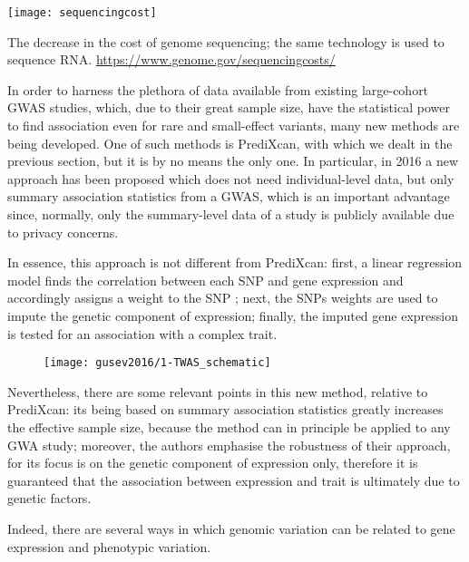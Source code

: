 \documentclass[../main.tex]{subfiles}
\begin{document}
\begin{marginfigure}[-4cm]
	\texttt{[image: sequencingcost]}
	\caption[Sequencing cost over time]{The decrease in the cost of 
	genome sequencing; the same technology is used to sequence RNA. 
	\url{https://www.genome.gov/sequencingcosts/}}
\end{marginfigure}

In order to harness the plethora of data available from existing 
large-cohort GWAS studies, which, due to their great sample size, have 
the statistical power to find association even for rare and small-effect 
variants, many new methods are being developed. One of such methods is 
PrediXcan, with which we dealt in the previous section, but it is by no 
means the only one. In particular, in 2016 a new approach has been 
proposed which does not need individual-level data, but only summary 
association statistics from a GWAS, 
which is an important advantage since, normally, only the summary-level 
data of a study is publicly available due to privacy concerns.

In essence, this approach is not different from PrediXcan: first, a 
linear regression model finds the correlation between each SNP and gene 
expression and accordingly assigns a weight to the SNP ; 
next, the SNPs weights are used to impute the \cis genetic component of 
expression; finally, the imputed gene expression is tested for an 
association  with a complex trait.

\begin{figure}
	\texttt{[image: gusev2016/1-TWAS\_schematic]}
	\caption{}
\end{figure}

Nevertheless, there are some relevant points in this new method, 
relative to PrediXcan: its being based on summary association statistics 
greatly increases the effective sample size, because the method can in 
principle be applied to any GWA study; moreover, the authors emphasise 
the robustness of their approach, for its focus is on the genetic 
component of expression only, therefore it is guaranteed that the 
association between expression and trait is ultimately due to genetic 
factors.

Indeed, there are several ways in which genomic variation can be related 
to gene expression and phenotypic variation.
\end{document}
